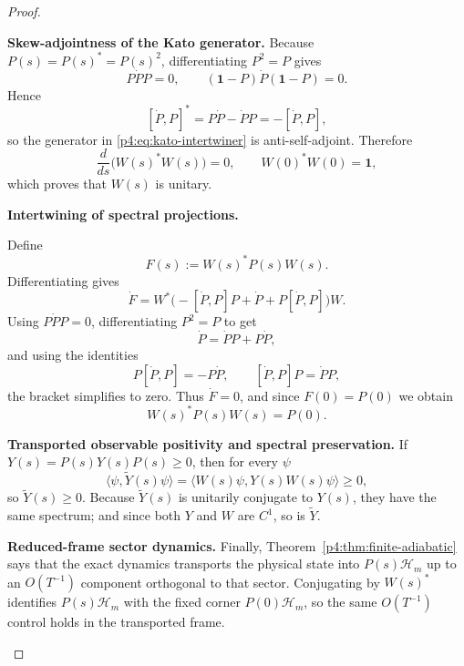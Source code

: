 \documentclass[12pt,a4paper]{article}
\begin{document}
\begin{proof}
\begin{proofsteps}

\item \textbf{Skew-adjointness of the Kato generator.}
Because \(P(s)=P(s)^*=P(s)^2\), differentiating \(P^2=P\) gives
\[
P\dot P P = 0,
\qquad
(\mathbf1-P)\dot P(\mathbf1-P)=0.
\]
Hence
\[
[\dot P,P]^* = P\dot P-\dot P P = -[\dot P,P],
\]
so the generator in \eqref{p4:eq:kato-intertwiner} is anti-self-adjoint.
Therefore
\[
\frac{d}{ds}\bigl(W(s)^*W(s)\bigr)=0,
\qquad W(0)^*W(0)=\mathbf1,
\]
which proves that \(W(s)\) is unitary.


\item \textbf{Intertwining of spectral projections.}
\leavevmode\par\noindent
Define
\[
  F(s):=W(s)^*P(s)W(s).
\]
Differentiating gives
\[
\dot F
=
W^*\bigl(-[\dot P,P]P+\dot P+P[\dot P,P]\bigr)W.
\]
Using \(P\dot P P=0\), differentiating \(P^2=P\) to get
\[
  \dot P=\dot P P+P\dot P,
\]
and using the identities
\[
  P[\dot P,P]=-P\dot P,
  \qquad
  [\dot P,P]P=\dot P P,
\]
the bracket simplifies to zero.  Thus \(\dot F=0\), and since \(F(0)=P(0)\) we
obtain
\[
W(s)^*P(s)W(s)=P(0).
\]

\item \textbf{Transported observable positivity and spectral preservation.}
If \(Y(s)=P(s)Y(s)P(s)\ge0\), then for every \(\psi\)
\[
\langle \psi,\widetilde Y(s)\psi\rangle
=
\langle W(s)\psi,Y(s)W(s)\psi\rangle\ge0,
\]
so \(\widetilde Y(s)\ge0\).
Because \(\widetilde Y(s)\) is unitarily conjugate to \(Y(s)\), they have the same spectrum; and since both \(Y\) and \(W\) are $C^1$, so is \(\widetilde Y\).

\item \textbf{Reduced-frame sector dynamics.}
Finally, Theorem~\ref{p4:thm:finite-adiabatic} says that the exact dynamics transports the physical state into \(P(s)\mathcal H_m\) up to an \(O(T^{-1})\) component orthogonal to that sector.
Conjugating by \(W(s)^*\) identifies \(P(s)\mathcal H_m\) with the fixed corner \(P(0)\mathcal H_m\), so the same \(O(T^{-1})\) control holds in the transported frame.
\end{proofsteps}

\end{proof}
\end{document}
